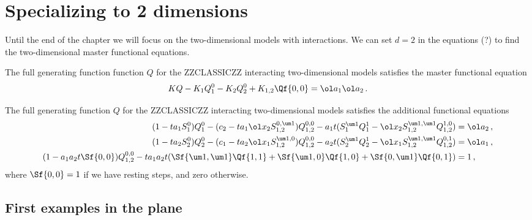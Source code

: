 
\section{Specializing to 2 dimensions}
Until the end of the chapter we will focus on the two-dimensional models with interactions. We can set $d=2$ in the equations (?) to find the two-dimensional master functional equations.
\begin{corollary} The full generating function function $Q$ for the ZZCLASSICZZ interacting two-dimensional models satisfies the master functional equation
\begin{align}
	KQ - K_1 Q_1^0 - K_2 Q_2^0 + K_{1,2} \Qf{0,0} = \ol a_1\ol a_2\,.
\end{align}
\end{corollary}
\begin{corollary} The full generating function $Q$ for the ZZCLASSICZZ interacting two-dimensional models satisfies the additional functional equations
\begin{align*}
(1-ta_1 S_1^0)Q_1^0 - (c_2-ta_1\ol x_2S_{1,2}^{0,\um 1})Q_{1,2}^{0,0} - a_1 t(S_1^{\um 1}Q_1^1-\ol x_2S_{1,2}^{\um 1,\um 1}Q_{1,2}^{1,0}) &=\ol a_2\,,\\
(1-ta_2 S_2^0)Q_2^0 - (c_1-ta_2\ol x_1S_{1,2}^{\um 1,0})Q_{1,2}^{0,0} -a_2t(S_2^{\um 1}Q_2^1-\ol x_1S_{1,2}^{\um 1,\um 1}Q_{1,2}^{0,1}) &=\ol a_1\,,\\
(1-a_1 a_2 t \Sf{0,0})Q_{1,2}^{0,0} - ta_1a_2t(\Sf{\um 1,\um 1}\Qf{1,1}+\Sf{\um 1,0}\Qf{1,0}+\Sf{0,\um 1}\Qf{0,1})&= 1\,,
\end{align*}
where $\Sf{0,0} = 1$ if we have resting steps, and zero otherwise.
\end{corollary}

\subsection{First examples in the plane}

